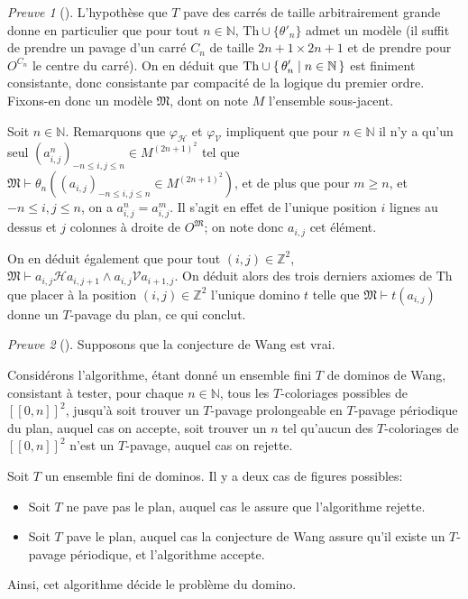 \documentclass{scrartcl}
\renewcommand{\le}{\leqslant}
\renewcommand{\ge}{\geqslant}
\newcommand{\N}{\mathbb N}
\newcommand{\Z}{\mathbb Z}
\renewcommand{\H}{\mathrel{\mathcal H}}
\newcommand{\V}{\mathrel{\mathcal V}}
\theoremstyle{definition}
\theoremstyle{remark}
\newtheorem{preuve}{Preuve}
\begin{document}
\begin{preuve}[]
  L'hypothèse que $T$ pave des carrés de taille arbitrairement grande donne en particulier que pour tout $n\in\N$, $\mathrm{Th}\cup \{\theta'_n\}$ admet un modèle (il suffit de prendre un pavage d'un carré $C_n$ de taille $2n+1\times 2n+1$ et de prendre pour $O^{C_n}$ le centre du carré). On en déduit que $\displaystyle\mathrm{Th}\cup \set{\theta'_n|n\in\N}$ est finiment consistante, donc consistante par compacité de la logique du premier ordre. Fixons-en donc un modèle $\mathfrak M$, dont on note $M$ l'ensemble sous-jacent.

  Soit $n\in\N$. Remarquons que $\varphi_\mathcal H$ et $\varphi_\mathcal V$ impliquent que pour $n\in\N$ il n'y a qu'un seul $(a_{i,j}^n)_{-n\le i,j\le n}\in M^{(2n+1)^2}$ tel que $\mathfrak M\vdash \theta_n\left((a_{i,j})_{-n\le i,j\le n}\in M^{(2n+1)^2}\right)$, et de plus que pour $m\ge n$, et $-n\le i,j\le n$, on a $a_{i,j}^n=a_{i,j}^m$. Il s'agit en effet de l'unique position $i$ lignes au dessus et $j$ colonnes à droite de $O^\mathfrak M$; on note donc $a_{i,j}$ cet élément.

  On en déduit également que pour tout $(i,j)\in\Z^2$, $\mathfrak M\vdash a_{i,j}\H a_{i,j+1}\land a_{i,j}\V a_{i+1,j}$. On déduit alors des trois derniers axiomes de $\mathrm{Th}$ que placer à la position $(i,j)\in\Z^2$ l'unique domino $t$ telle que $\mathfrak M\vdash t(a_{i,j})$ donne un $T$-pavage du plan, ce qui conclut. 
\end{preuve}

\begin{preuve}[]
  Supposons que la conjecture de Wang est vrai.
  
  Considérons l'algorithme, étant donné un ensemble fini $T$ de dominos de Wang, consistant à tester, pour chaque $n\in\N$, tous les $T$-coloriages possibles de $[\![0,n]\!]^2$, jusqu'à soit trouver un $T$-pavage prolongeable en $T$-pavage périodique du plan, auquel cas on accepte, soit trouver un $n$ tel qu'aucun des $T$-coloriages de $[\![0,n]\!]^2$ n'est un $T$-pavage, auquel cas on rejette.

  Soit $T$ un ensemble fini de dominos. Il y a deux cas de figures possibles:
  \begin{itemize}
    \item Soit $T$ ne pave pas le plan, auquel cas le  assure que l'algorithme rejette.
    \item Soit $T$ pave le plan, auquel cas la conjecture de Wang assure qu'il existe un $T$-pavage périodique, et l'algorithme accepte.
  \end{itemize}

  Ainsi, cet algorithme décide le problème du domino.
\end{preuve}
\end{document}

